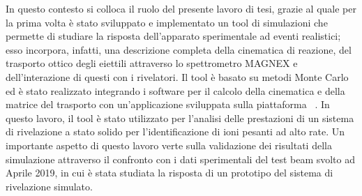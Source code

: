 In questo contesto si colloca il ruolo del presente lavoro di tesi, grazie al quale per la prima volta è stato sviluppato e implementato un tool di simulazioni che permette di studiare la risposta dell'apparato sperimentale ad eventi realistici; esso incorpora, infatti, una descrizione completa della cinematica di reazione, del trasporto ottico degli eiettili attraverso lo spettrometro MAGNEX e dell'interazione di questi con i rivelatori.
Il tool è basato su metodi Monte Carlo ed è stato realizzato integrando i software per il calcolo della cinematica e della matrice del trasporto con un'applicazione sviluppata sulla piattaforma \geant~\cite{agostinelli:nima02,allison:nima16,allison:ieeetns06}.
In questo lavoro, il tool è stato utilizzato per l'analisi delle prestazioni di un sistema di rivelazione a stato solido per l'identificazione di ioni pesanti ad alto rate.
Un importante aspetto di questo lavoro verte sulla validazione dei risultati della simulazione attraverso il confronto con i dati sperimentali del test beam svolto ad Aprile 2019, in cui è stata studiata la risposta di un prototipo del sistema di rivelazione simulato.






\section{} \label{sez:upgrade_apparato}

